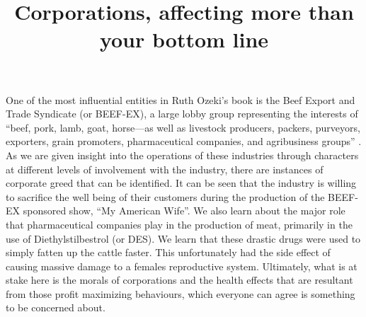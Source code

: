 \documentclass{article}
\title{Corporations, affecting more than your bottom line}
\begin{document}
\makeheader

One of the most influential entities in Ruth Ozeki's book
 is the Beef Export and Trade Syndicate (or BEEF-EX),
a large lobby group representing the interests of ``beef, pork, lamb, goat,
horse—as well as livestock producers, packers, purveyors, exporters, grain
promoters, pharmaceutical companies, and agribusiness groups''
\cite{ozeki1998my}. As we are given insight into the operations of these
industries through characters at different levels of involvement with the
industry, there are instances of corporate greed that can be identified. It
can be seen that the industry is willing to sacrifice the well being of
their customers during the production of the BEEF-EX sponsored show, ``My
American Wife''. We also learn about the major role that pharmaceutical
companies play in the production of meat, primarily in the use of
Diethylstilbestrol (or DES). We learn that these drastic drugs were used to
simply fatten up the cattle faster. This unfortunately had the side effect
of causing massive damage to a females reproductive system. Ultimately, what
is at stake here is the morals of corporations and the health effects that
are resultant from those profit maximizing behaviours, which everyone can
agree is something to be concerned about.

\end{document}

